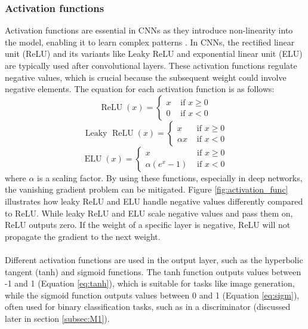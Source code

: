 \subsubsection{Activation functions}
Activation functions are essential in CNNs as they introduce non-linearity into the model, enabling it to learn complex patterns \cite{wu2017introduction}. In CNNs, the rectified linear unit (ReLU) and its variants like Leaky ReLU and exponential linear unit (ELU) are typically used after convolutional layers. These activation functions regulate negative values, which is crucial because the subsequent weight could involve negative elements. The equation for each activation function is as follows:
\begin{equation}
	\operatorname{ReLU}(x)= \begin{cases}x & \text { if } x \geq 0 \\ 0 & \text { if } x<0\end{cases}
	\label{eq:relu}
\end{equation}
\begin{equation}
	\text { Leaky } \operatorname{ReLU}(x)= \begin{cases}x & \text { if } x \geq 0 \\ \alpha x & \text { if } x<0\end{cases}
	\label{eq:leaky_relu}
\end{equation}
\begin{equation}
	\operatorname{ELU}(x)= \begin{cases}x & \text { if } x \geq 0 \\ \alpha\left(e^x-1\right) & \text { if } x<0\end{cases}
	\label{eq:elu}
\end{equation}
\noindent where $\alpha$ is a scaling factor. By using these functions, especially in deep networks, the vanishing gradient problem can be mitigated. Figure \ref{fig:activation_func} illustrates how leaky ReLU and ELU handle negative values differently compared to ReLU. While leaky ReLU and ELU scale negative values and pass them on, ReLU outputs zero. If the weight of a specific layer is negative, ReLU will not propagate the gradient to the next weight.
\\\\
Different activation functions are used in the output layer, such as the hyperbolic tangent (tanh) and sigmoid functions. The tanh function outputs values between -1 and 1 (Equation \ref{eq:tanh}), which is suitable for tasks like image generation, while the sigmoid function outputs values between 0 and 1 (Equation \ref{eq:sigm}), often used for binary classification tasks, such as in a discriminator (discussed later in section \ref{subsec:M1}).
